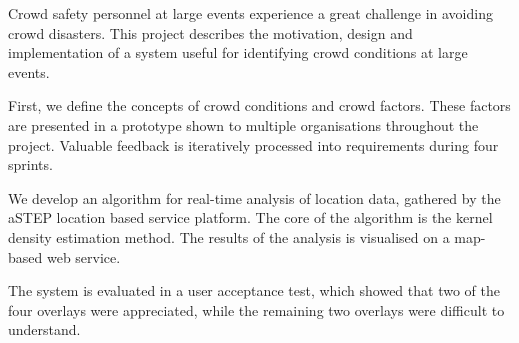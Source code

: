 {
\setlength{\parskip}{0.5em}
Crowd safety personnel at large events experience a great challenge in avoiding crowd disasters. This project describes the motivation, design and implementation of a system useful for identifying crowd conditions at large events.

First, we define the concepts of crowd conditions and crowd factors. These factors are presented in a prototype shown to multiple organisations throughout the project. Valuable feedback is iteratively processed into requirements during four sprints.

We develop an algorithm for real-time analysis of location data, gathered by the aSTEP location based service platform. The core of the algorithm is the kernel density estimation method. The results of the analysis is visualised on a map-based web service.

The system is evaluated in a user acceptance test, which showed that two of the four overlays were appreciated, while the remaining two overlays were difficult to understand.
}


